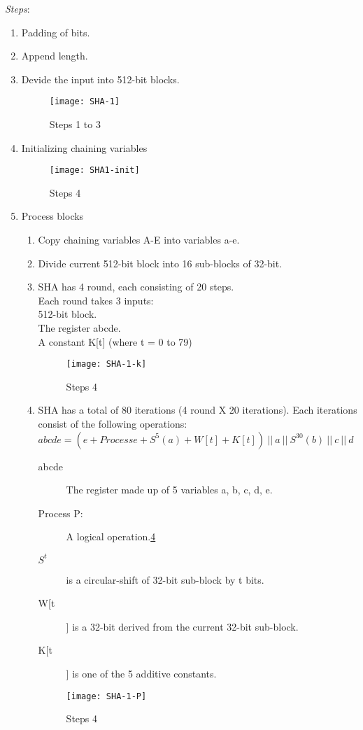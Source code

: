 \textit{Steps}\cite{sha-1-slideshare}:
\\
\begin{enumerate}
	\itemsep1em
	\item Padding of bits.
	\item Append length.
	\item Devide the input into 512-bit blocks.
		\begin{figure}[!h]
			\centering\texttt{[image: SHA-1]}
			\caption{Steps 1 to 3}
			\label{fig:SHA-1} 
		\end{figure}
	\item Initializing chaining variables
		\begin{figure}[!h]
			\centering\texttt{[image: SHA1-init]}
			\caption{Steps 4}
			\label{fig:SHA-1-init} 
		\end{figure}
	\item Process blocks
		\begin{enumerate}[label=\alph*.]
			\item Copy chaining variables A-E into variables a-e.
			\item Divide current 512-bit block into 16 sub-blocks of 32-bit.
			\item SHA has 4 round, each consisting of 20 steps.\\
				Each round takes 3 inputs:\\
				512-bit block.\\
				The register abcde.\\
				A constant K[t] (where t = 0 to 79)
				\begin{figure}[!h]
					\centering\texttt{[image: SHA-1-k]}
					\caption{Steps 4}
					\label{fig:SHA-1-k} 
				\end{figure}
				\item SHA has a total of 80 iterations (4 round X 20 iterations). Each iterations consist of the following operations:\\
				$abcde = (e + Process e + S^5(a) + W[t] + K[t])\ ||\ a\ ||\ S^{30}(b)\ ||\ c\ ||\ d$\\
					\begin{description}
						\item[abcde] The register made up of 5 variables a, b, c, d, e.
						\item[Process P:] A logical operation.\ref{fig:SHA-1-P} 
						\item[$S^t$] is a circular-shift of 32-bit sub-block by t bits.
						\item[W[t]] is a 32-bit derived from the current 32-bit sub-block.
						\item[K[t]] is one of the 5 additive constants.
					\end{description}
				\begin{figure}[!h]
					\centering\texttt{[image: SHA-1-P]}
					\caption{Steps 4}
					\label{fig:SHA-1-P} 
				\end{figure}
					
		\end{enumerate}
\end{enumerate}

